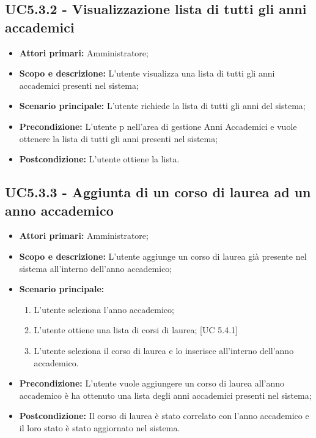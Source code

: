 \documentclass[AnalisiDeiRequisiti.tex]{subfiles}
\begin{document}
\subsection{UC5.3.2 - Visualizzazione lista di tutti gli anni accademici}
\begin{itemize}
	\item \textbf{Attori primari:} Amministratore;
	\item \textbf{Scopo e descrizione:} L'utente visualizza una lista di tutti gli anni accademici presenti nel sistema;
	\item \textbf{Scenario principale:} L'utente richiede la lista di tutti gli anni del sistema;
	\item \textbf{Precondizione:} L'utente p nell'area di gestione Anni Accademici e vuole ottenere la lista di tutti gli anni presenti nel sistema; 
	\item \textbf{Postcondizione:} L'utente ottiene la lista.
\end{itemize}
\subsection{UC5.3.3 - Aggiunta di un corso di laurea ad un anno accademico}
\begin{itemize}
	\item \textbf{Attori primari:} Amministratore;
	\item \textbf{Scopo e descrizione:} L'utente aggiunge un corso di laurea già presente nel sistema all'interno dell'anno accademico;
	\item \textbf{Scenario principale:}
	\begin{enumerate}
		\item L'utente seleziona l'anno accademico;
		\item L'utente ottiene una lista di corsi di laurea; [UC 5.4.1]
		\item L'utente seleziona il corso di laurea e lo inserisce all'interno dell'anno accademico.
	\end{enumerate}
	\item \textbf{Precondizione:} L'utente vuole aggiungere un corso di laurea all'anno accademico è ha ottenuto una lista degli anni accademici presenti nel sistema; 
	\item \textbf{Postcondizione:} Il corso di laurea è stato correlato con l'anno accademico e il loro stato è stato aggiornato nel sistema.
\end{itemize}
\end{document}
